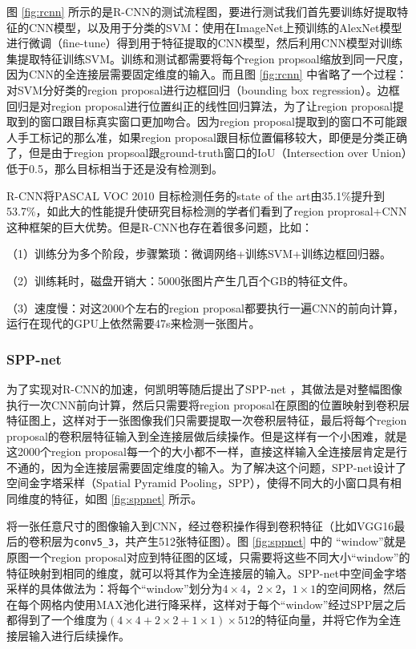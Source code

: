 图 \ref{fig:rcnn} 所示的是R-CNN的测试流程图，要进行测试我们首先要训练好提取特征的CNN模型，以及用于分类的SVM：使用在ImageNet上预训练的AlexNet模型进行微调（fine-tune）得到用于特征提取的CNN模型，然后利用CNN模型对训练集提取特征训练SVM。训练和测试都需要将每个region propsoal缩放到同一尺度，因为CNN的全连接层需要固定维度的输入。而且图 \ref{fig:rcnn} 中省略了一个过程：对SVM分好类的region proposal进行边框回归（bounding box regression）。边框回归是对region proposal进行位置纠正的线性回归算法，为了让region proposal提取到的窗口跟目标真实窗口更加吻合。因为region proposal提取到的窗口不可能跟人手工标记的那么准，如果region proposal跟目标位置偏移较大，即便是分类正确了，但是由于region propsoal跟ground-truth窗口的IoU（Intersection over Union）低于0.5，那么目标相当于还是没有检测到。

R-CNN将PASCAL VOC 2010 \cite{pascal-voc-2010} 目标检测任务的state of the art由35.1\%提升到53.7\%，如此大的性能提升使研究目标检测的学者们看到了region proprosal+CNN这种框架的巨大优势。但是R-CNN也存在着很多问题，比如：
\begin{namelist}{}
	\item （1）训练分为多个阶段，步骤繁琐：微调网络+训练SVM+训练边框回归器。
	\item （2）训练耗时，磁盘开销大：5000张图片产生几百个GB的特征文件。
	\item （3）速度慢：对这2000个左右的region proposal都要执行一遍CNN的前向计算，运行在现代的GPU上依然需要47s来检测一张图片。
\end{namelist}

\subsubsection{SPP-net}
为了实现对R-CNN的加速，何凯明等随后提出了SPP-net \cite{sppnet}，其做法是对整幅图像执行一次CNN前向计算，然后只需要将region proposal在原图的位置映射到卷积层特征图上，这样对于一张图像我们只需要提取一次卷积层特征，最后将每个region proposal的卷积层特征输入到全连接层做后续操作。但是这样有一个小困难，就是这2000个region proposal每一个的大小都不一样，直接这样输入全连接层肯定是行不通的，因为全连接层需要固定维度的输入。为了解决这个问题，SPP-net设计了空间金字塔采样（Spatial Pyramid Pooling，SPP），使得不同大的小窗口具有相同维度的特征，如图 \ref{fig:sppnet} 所示。

将一张任意尺寸的图像输入到CNN，经过卷积操作得到卷积特征（比如VGG16最后的卷积层为\texttt{conv5\_3}，共产生512张特征图）。图 \ref{fig:sppnet} 中的 ``window''就是原图一个region proposal对应到特征图的区域，只需要将这些不同大小``window''的特征映射到相同的维度，就可以将其作为全连接层的输入。SPP-net中空间金字塔采样的具体做法为：将每个``window''划分为$4\times4$，$2\times2$，$1\times1$的空间网格，然后在每个网格内使用MAX池化进行降采样，这样对于每个``window''经过SPP层之后都得到了一个维度为$(4\times4+2\times2+1\times1)\times512$的特征向量，并将它作为全连接层输入进行后续操作。

